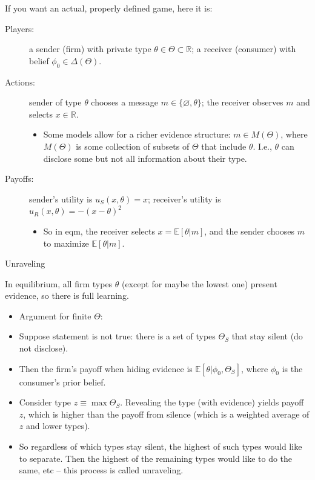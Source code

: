 \documentclass[english,10pt
,aspectratio=169
]{beamer}
\begin{document}
\begin{frame}
	If you want an actual, properly defined game, here it is:
	\begin{description}
		\item[Players:] a sender (firm) with private type $\theta \in \Theta \subset \mathbb{R}$; a receiver (consumer) with belief $\phi_0 \in \varDelta(\Theta)$.
		\item[Actions:] sender of type $\theta$ chooses a message $m \in \{\varnothing, \theta\}$; the receiver observes $m$ and selects $x \in \mathbb{R}$.
		\begin{itemize}
			\item Some models allow for a richer evidence structure: $m \in M(\Theta)$, where $M(\Theta)$ is some collection of subsets of $\Theta$ that include $\theta$. I.e., $\theta$ can disclose some but not all information about their type. \citep{milgrom_good_1981}
		\end{itemize}
		\item[Payoffs:] sender's utility is $u_S(x,\theta) = x$; receiver's utility is $u_R(x,\theta) = -(x-\theta)^2$
		\begin{itemize}
			\item So in eqm, the receiver selects $x = \mathbb{E}[\theta|m]$, and the sender chooses $m$ to maximize $\mathbb{E}[\theta|m]$.
		\end{itemize}
	\end{description}
\end{frame}


\begin{frame}{Unraveling}
	\begin{theorem}[Unraveling]
		In equilibrium, all firm types $\theta$ (except for maybe the lowest one) present evidence, so there is full learning.
	\end{theorem}
	\begin{itemize}[<+->]
		\item Argument for finite $\Theta$:
		\item Suppose statement is not true: there is a set of types $\Theta_S$ that stay silent (do not disclose).
		\item Then the firm's payoff when hiding evidence is $\mathbb{E}[\theta | \phi_0, \Theta_S]$, where $\phi_0$ is the consumer's prior belief.
		\item Consider type $z \equiv \max \Theta_S$. Revealing the type (with evidence) yields payoff $z$, which is higher than the payoff from silence (which is a weighted average of $z$ and lower types).
		\item So regardless of which types stay silent, the highest of such types would like to separate. Then the highest of the remaining types would like to do the same, etc -- this process is called \alert{unraveling}.
	\end{itemize}
\end{frame}
\end{document}
